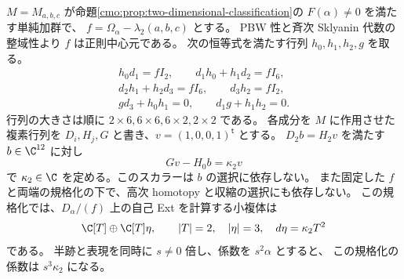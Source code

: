 \begin{lemma}[行列係数の長さ三分解と高次作用の抽出]
$M=M_{a,b,c}$ が命題\ref{cmo:prop:two-dimensional-classification}の
$F(\alpha)\ne0$ を満たす単純加群で、
$f=\Omega_\alpha-\lambda_2(a,b,c)$ とする。
PBW 性と斉次 Sklyanin 代数の整域性より $f$ は正則中心元である。
次の恒等式を満たす行列 $h_0,h_1,h_2,g$ を取る。
\begin{equation}\label{cmo:eq:two-dimensional-homotopies}
 \begin{gathered}
 h_0d_1=fI_2,\qquad d_1h_0+h_1d_2=fI_6,\\
 d_2h_1+h_2d_3=fI_6,\qquad d_3h_2=fI_2,\\
 gd_3+h_0h_1=0,\qquad d_1g+h_1h_2=0.
 \end{gathered}
\end{equation}
行列の大きさは順に $2\times6,6\times6,6\times2,2\times2$ である。
各成分を $M$ に作用させた複素行列を
$D_i,H_j,G$ と書き、$v=(1,0,0,1)^{\mathsf t}$ とする。
$D_2b=H_2v$ を満たす $b\in\C^{12}$ に対し
\begin{equation}\label{cmo:eq:two-dimensional-kappa-extraction}
 Gv-H_0b=\kappa_2v
\end{equation}
で $\kappa_2\in\C$ を定める。このスカラーは $b$ の選択に依存しない。
また固定した $f$ と両端の規格化の下で、高次 homotopy と収縮の選択にも依存しない。
この規格化では、$D_\alpha/(f)$ 上の自己 Ext を計算する小複体は
\begin{equation}\label{cmo:eq:two-dimensional-effective}
 \C[T]\oplus\C[T]\eta,\qquad |T|=2,\quad|\eta|=3,\quad
 d\eta=\kappa_2T^2
\end{equation}
である。
半跡と表現を同時に $s\ne0$ 倍し、係数を $s^2\alpha$ とすると、
この規格化の係数は $s^3\kappa_2$ になる。
\end{lemma}

